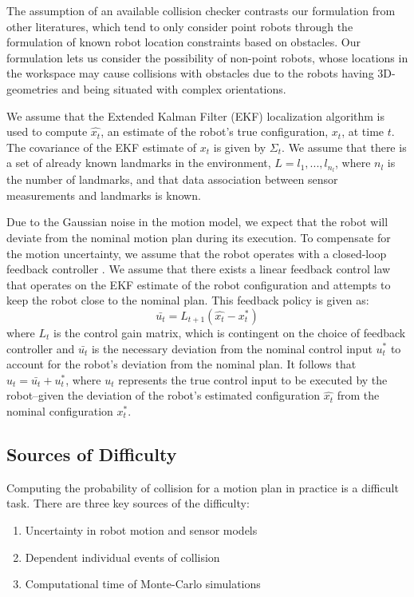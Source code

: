 \documentclass[journal]{IEEEtran}
\begin{document}
The assumption of an available collision checker contrasts our formulation from other literatures, which tend to only consider point robots through the formulation of known robot location constraints based on obstacles. Our formulation lets us consider the possibility of non-point robots, whose locations in the workspace may cause collisions with obstacles due to the robots having 3D-geometries and being situated with complex orientations.

We assume that the Extended Kalman Filter (EKF) localization algorithm \cite{IEEEhowto:thrun} is used to compute $\hat{x_t}$, an estimate of the robot's true configuration, $x_t$, at time $t$. The covariance of the EKF estimate of $x_t$ is given by $\Sigma_t$. We assume that there is a set  of already known landmarks in the environment, $L = {l_1,...,l_{n_l}}$, where $n_l$ is the number of landmarks, and that data association between sensor measurements and landmarks is known.

Due to the Gaussian noise in the motion model, we expect that the robot will deviate from the nominal motion plan during its execution. To compensate for the motion uncertainty, we assume that the robot operates with a closed-loop feedback controller \cite{IEEEhowto:stengel}. We assume that there exists a linear feedback control law that operates on the EKF estimate of the robot configuration and attempts to keep the robot close to the nominal plan. This feedback policy is given as:%
$$\bar{u_t} = L_{t+1}(\hat{x_t} - x_t^*) $$
where $L_{t}$ is the control gain matrix, which is contingent on the choice of feedback controller \cite{IEEEhowto:stengel} and $\bar{u_t}$ is the necessary deviation from the nominal control input $u_t^*$ to account for the robot's deviation from the nominal plan. It follows that $u_t = \bar{u_t} + u_t^*$, where $u_t$ represents the true control input to be executed by the robot--given the deviation of the robot's estimated configuration $\hat{x_t}$ from the nominal configuration $x_t^*$.

\subsection{Sources of Difficulty}
Computing the probability of collision for a motion plan in practice is a difficult task. There are three key sources of the difficulty:
\begin{enumerate}
\item Uncertainty in robot motion and sensor models
\item Dependent individual events of collision
\item Computational time of Monte-Carlo simulations
\end{enumerate}
\end{document}
